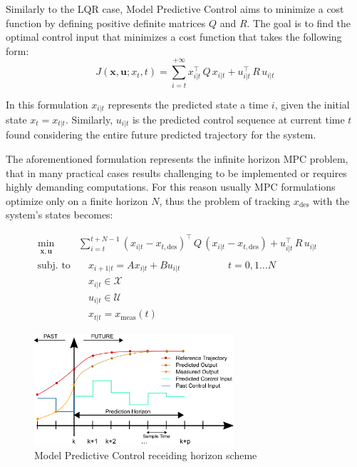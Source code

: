 \documentclass[a4paper,12pt,oneside]{book}
\begin{document}
\bigskip
Similarly to the LQR case, Model Predictive Control aims to minimize a cost function by defining positive definite matrices $Q$ and $R$. The goal is to find the optimal control input that minimizes a cost function that takes the following form:
\begin{equation}
    J(\boldsymbol{x}, \boldsymbol{u}; x_t, t) = \sum_{i=t} ^{+ \infty} x_{i|t}^\top \, Q \, x_{i|t} + u_{i|t}^\top \, R \, u_{i|t}
\end{equation}

In this formulation $x_{i|t}$ represents the predicted state a time $i$, given the initial state $x_t = x_{t|t}$. 
Similarly, $u_{i|t}$ is the predicted control sequence at current time $t$ found considering the entire future predicted trajectory for the system.

\bigskip
The aforementioned formulation represents the infinite horizon MPC problem, that in many practical cases results challenging to be implemented or requires highly demanding computations.
For this reason usually MPC formulations optimize only on a finite horizon $N$, thus the problem of tracking $x_{\text{des}}$ with the system's states becomes:

\begin{equation}
\begin{alignedat}{2}
	\min_{\substack{\boldsymbol{x}, \boldsymbol{u}}}\quad & \sum_{i=t}^{t+N-1} (x_{i|t} - x_{t,\text{des}}) ^\top \, Q \, (x_{i|t} - x_{t,\text{des}}) +  u_{i|t}^\top \, R \, u_{i|t} &&   \\
	\text{subj. to} & \quad x_{i+1|t}  = A x_{i|t} + B u_{i|t}   \hspace{2cm} t = 0, 1 \ldots N &&  \\
     &\quad x_{i|t} \in \mathcal{X} && \\
    &\quad u_{i|t} \in \mathcal{U} && \\
    &\quad x_{t|t} = x_{\text{meas}}(t) && 
\end{alignedat}
\label{MPC1}
\end{equation}

\begin{figure}
	\centering
	\includegraphics[width=0.66\textwidth]{MPC.png}
	\caption{Model Predictive Control receiding horizon scheme}
	\label{image:mpc}
\end{figure}
\end{document}
